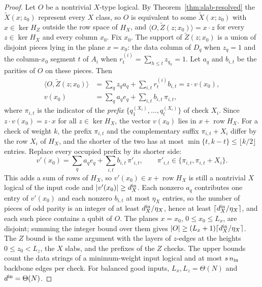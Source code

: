 \documentclass[aps,prx,reprint,superscriptaddress,nofootinbib,floatfix,longbibliography]{revtex4-2}
\theoremstyle{definition}
\begin{document}
\begin{proof}
Let $O$ be a nontrivial $X$-type logical.  By Theorem~\ref{thm:slab-resolved}
the $\widetilde X(x;z_0)$ represent every $X$ class, so $O$ is equivalent to
some $\widetilde X(x;z_0)$ with $x\in\ker H_Z$ outside the row space of $H_X$,
and $\langle O,\widetilde Z(z;x_0)\rangle=x\cdot z$ for every $z\in\ker H_X$ and
every column $x_0$.  Fix $x_0$.  The support of $\widetilde Z(z;x_0)$ is a union
of disjoint pieces lying in the plane $x=x_0$: the data column of $D_q$ when
$z_q=1$ and the column-$x_0$ segment $t$ of $A_i$ when
$r^{(i)}_t=\sum_{h\le t}z_{q_h}=1$.  Let $a_q$ and $b_{i,t}$ be the parities of
$O$ on these pieces.  Then
\begin{align*}
 \langle O,\widetilde Z(z;x_0)\rangle&=\sum_q z_qa_q+\sum_{i,t}r^{(i)}_tb_{i,t}
 =z\cdot v(x_0),\\
 v(x_0)&=\sum_q a_q e_q+\sum_{i,t}b_{i,t}\,\pi_{i,t},
\end{align*}
where $\pi_{i,t}$ is the indicator of the \emph{prefix}
$\{q^{(X_i)}_1,\ldots,q^{(X_i)}_t\}$ of check $X_i$.  Since
$z\cdot v(x_0)=z\cdot x$ for all $z\in\ker H_X$, the vector $v(x_0)$ lies in
$x+\operatorname{row}H_X$.  For a check of weight $k$, the prefix $\pi_{i,t}$
and the complementary suffix $\pi_{i,t}+X_i$ differ by the row $X_i$ of $H_X$,
and the shorter of the two has at most $\min\{t,k-t\}\le\lfloor k/2\rfloor$
entries.  Replace every occupied prefix by its shorter side:
\begin{equation*}
 v'(x_0)=\sum_q a_q e_q+\sum_{i,t}b_{i,t}\,\pi'_{i,t},\qquad
 \pi'_{i,t}\in\{\pi_{i,t},\pi_{i,t}+X_i\}.
\end{equation*}
This adds a sum of rows of $H_X$, so $v'(x_0)\in x+\operatorname{row}H_X$ is
still a nontrivial $X$ logical of the input code and $|v'(x_0)|\ge d_X^{\rm in}$.
Each nonzero $a_q$ contributes one entry of $v'(x_0)$ and each nonzero
$b_{i,t}$ at most $\eta_X$ entries, so the number of pieces of odd parity is
an integer of at least $d_X^{\rm in}/\eta_X$, hence at least
$\lceil d_X^{\rm in}/\eta_X\rceil$, and each such piece contains a qubit of
$O$.  The planes $x=x_0$, $0\le x_0\le L_x$, are disjoint; summing the integer
bound over them gives $|O|\ge(L_x+1)\lceil d_X^{\rm in}/\eta_X\rceil$.  The $Z$
bound is the same argument with the layers of $z$-edges at the heights
$0\le z_0<L_z$, the $X$ slabs, and the prefixes of the $Z$ checks.  The upper
bounds count the data strings of a minimum-weight input logical and at most
$s\,n_{\rm in}$ backbone edges per check.  For balanced good inputs,
$L_x,L_z=\Theta(N)$ and $d^{\rm in}=\Theta(N)$.
\end{proof}
\end{document}
